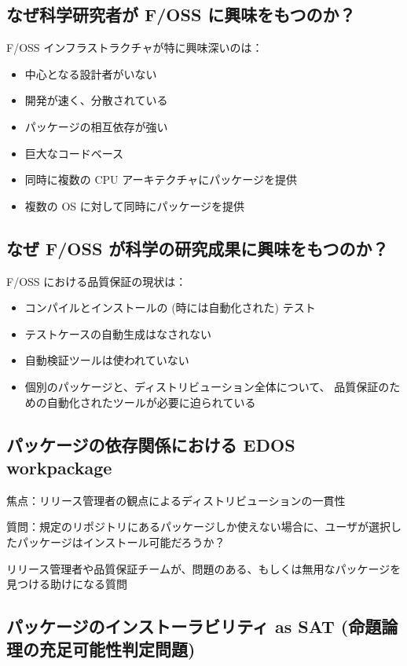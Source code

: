 \documentclass[mingoth,a4paper]{jsarticle}
\begin{document}
\subsection{なぜ科学研究者が F/OSS に興味をもつのか？}

F/OSS インフラストラクチャが特に興味深いのは：
\begin{itemize}
    \item 中心となる設計者がいない
    \item 開発が速く、分散されている
    \item パッケージの相互依存が強い
    \item 巨大なコードベース
    \item 同時に複数の CPU アーキテクチャにパッケージを提供
    \item 複数の OS に対して同時にパッケージを提供
\end{itemize}

\subsection{なぜ F/OSS が科学の研究成果に興味をもつのか？}

F/OSS における品質保証の現状は：
\begin{itemize}
    \item コンパイルとインストールの (時には自動化された) テスト
    \item テストケースの自動生成はなされない
    \item 自動検証ツールは使われていない
    \item 個別のパッケージと、ディストリビューション全体について、
          品質保証のための自動化されたツールが必要に迫られている
\end{itemize}


\subsection{パッケージの依存関係における EDOS workpackage}

焦点：リリース管理者の観点によるディストリビューションの一貫性

質問：規定のリポジトリにあるパッケージしか使えない場合に、ユーザが選択したパッケージはインストール可能だろうか？

リリース管理者や品質保証チームが、問題のある、もしくは無用なパッケージを見つける助けになる質問



\subsection{パッケージのインストーラビリティ as SAT (命題論理の充足可能性判定問題)}
\end{document}
